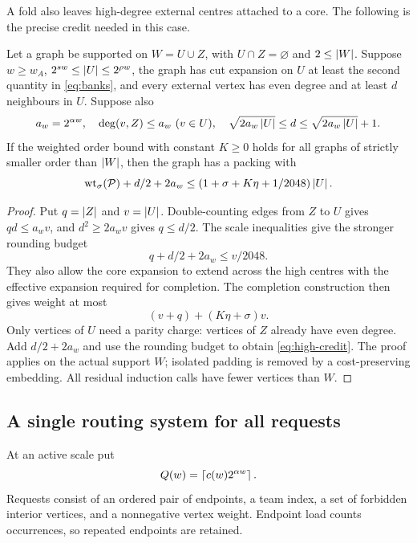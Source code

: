 A fold also leaves high-degree external centres attached to a core. The
following is the precise credit needed in this case.
\begin{lemma}\label{lem:completion}
Let a graph be supported on $W=U\cup Z$, with $U\cap Z=\varnothing$ and
$2\le\left|W\right|$. Suppose $w\ge w_A$, $2^{sw}\le\left|U\right|\le2^{\rho w}$,
the graph has cut expansion on $U$ at least the second quantity in
\eqref{eq:banks}, and every external vertex has even degree and at least
$d$ neighbours in $U$. Suppose also
\[
 a_w=2^{\alpha w},\quad
 \deg(v,Z)\le a_w\ (v\in U),\quad
 \sqrt{2a_w\left|U\right|}\le d\le\sqrt{2a_w\left|U\right|}+1.
\]
If the weighted order bound with constant $K\ge0$ holds for all graphs of
strictly smaller order than $\left|W\right|$, then the graph has a packing with
\begin{equation}\label{eq:high-credit}
 \operatorname{wt}_\sigma(\mathcal P)+d/2+2a_w
            \le(1+\sigma+K\eta+1/2048)\left|U\right|.
\end{equation}
\end{lemma}
\begin{proof}
Put $q=\left|Z\right|$ and $v=\left|U\right|$. Double-counting edges from $Z$ to $U$
gives $qd\le a_wv$, and $d^2\ge2a_wv$ gives $q\le d/2$.
The scale inequalities give the stronger rounding budget
\[
                    q+d/2+2a_w\le v/2048.
\]
They also allow the core expansion to extend across the high centres with
the effective expansion required for completion. The completion construction
then gives weight at most
\[
                 (v+q)+(K\eta+\sigma)v.
\]
Only vertices of $U$ need a parity charge: vertices of $Z$ already have
even degree. Add $d/2+2a_w$ and use the rounding budget to obtain
\eqref{eq:high-credit}. The proof applies on the actual support $W$;
isolated padding is removed by a cost-preserving embedding. All residual
induction calls have fewer vertices than $W$.
\end{proof}

\subsection{A single routing system for all requests}
At an active scale put
\begin{equation}\label{eq:teams}
                 Q(w)=\left\lceil c(w)2^{\alpha w}\right\rceil.
\end{equation}
Requests consist of an ordered pair of endpoints, a team index, a set of
forbidden interior vertices, and a nonnegative vertex weight. Endpoint
load counts occurrences, so repeated endpoints are retained.

